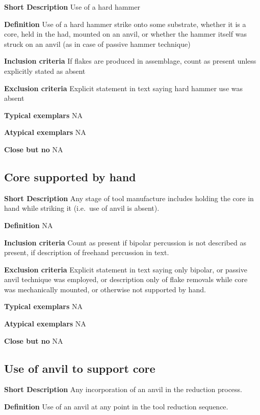 \documentclass[
]{article}
\begin{document}
\textbf{Short Description} Use of a hard hammer

\textbf{Definition} Use of a hard hammer strike onto some substrate,
whether it is a core, held in the had, mounted on an anvil, or whether
the hammer itself was struck on an anvil (as in case of passive hammer
technique)

\textbf{Inclusion criteria} If flakes are produced in assemblage, count
as present unless explicitly stated as absent

\textbf{Exclusion criteria} Explicit statement in text saying hard
hammer use was absent

\textbf{Typical exemplars} NA

\textbf{Atypical exemplars} NA

\textbf{Close but no} NA

\hypertarget{core-supported-by-hand}{%
\subsection{Core supported by hand}\label{core-supported-by-hand}}

\textbf{Short Description} Any stage of tool manufacture includes
holding the core in hand while striking it (i.e.~use of anvil is
absent).

\textbf{Definition} NA

\textbf{Inclusion criteria} Count as present if bipolar percussion is
not described as present, if description of freehand percussion in text.

\textbf{Exclusion criteria} Explicit statement in text saying only
bipolar, or passive anvil technique was employed, or description only of
flake removals while core was mechanically mounted, or otherwise not
supported by hand.

\textbf{Typical exemplars} NA

\textbf{Atypical exemplars} NA

\textbf{Close but no} NA

\hypertarget{use-of-anvil-to-support-core}{%
\subsection{Use of anvil to support
core}\label{use-of-anvil-to-support-core}}

\textbf{Short Description} Any incorporation of an anvil in the
reduction process.

\textbf{Definition} Use of an anvil at any point in the tool reduction
sequence.
\end{document}
